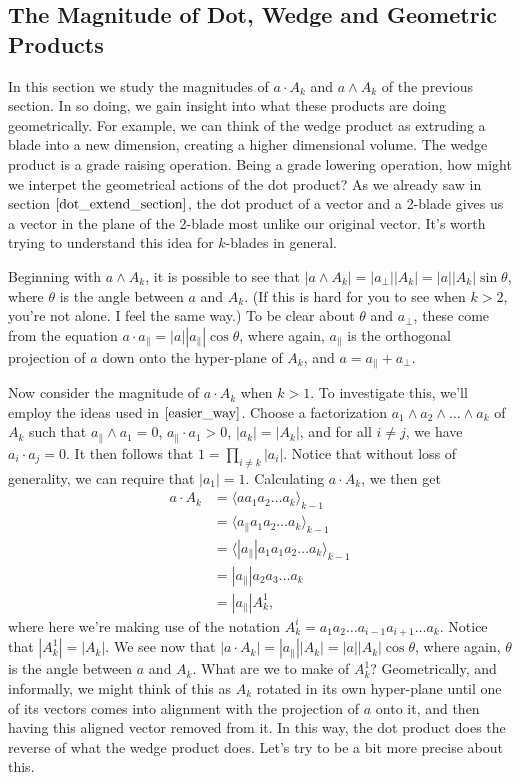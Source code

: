 \documentclass{article}
\newcommand{\prl}{\parallel}
\newcommand{\prp}{\perp}
\begin{document}
\subsection{The Magnitude of Dot, Wedge and Geometric Products}

In this section we study the magnitudes of $a\cdot A_k$
and $a\wedge A_k$ of the previous section.  In so doing,
we gain insight into what these products are doing geometrically.
For example, we can think of the wedge product as extruding
a blade into a new dimension, creating a higher dimensional
volume.  The wedge product is a grade raising operation.
Being a grade lowering operation, how might we interpet the
geometrical actions of the dot product?  As we already saw
in section $\eqref{dot_extend_section}$, the dot product of a vector and a 2-blade
gives us a vector in the plane of the 2-blade most unlike our original vector.
It's worth trying to understand this idea for $k$-blades in general.

Beginning with $a\wedge A_k$, it is possible to see that
$|a\wedge A_k|=|a_{\prp}||A_k|=|a||A_k|\sin\theta$,
where $\theta$ is the angle between $a$ and $A_k$.
(If this is hard for you to see when $k>2$, you're not alone.
I feel the same way.)  To be clear about $\theta$ and $a_{\prp}$,
these come from the equation $a\cdot a_{\prl}=|a||a_{\prl}|\cos\theta$,
where again, $a_{\prl}$ is the orthogonal projection of $a$
down onto the hyper-plane of $A_k$, and $a=a_{\prl}+a_{\prp}$.

Now consider the magnitude of $a\cdot A_k$ when $k>1$.  To investigate
this, we'll employ the ideas used in $\eqref{easier_way}$.
Choose a factorization $a_1\wedge a_2\wedge\dots\wedge a_k$ of $A_k$
such that $a_{\prl}\wedge a_1=0$, $a_{\prl}\cdot a_1>0$, $|a_k|=|A_k|$, and
for all $i\neq j$, we have $a_i\cdot a_j=0$.  It then follows that
$1=\prod_{i\neq k}|a_i|$.  Notice that without loss of generality, we can
require that $|a_1|=1$.  Calculating $a\cdot A_k$, we then get
\begin{align*}
a\cdot A_k &= \langle aa_1a_2\dots a_k\rangle_{k-1} \\
 &= \langle a_{\prl}a_1a_2\dots a_k\rangle_{k-1} \\
 &= \langle |a_{\prl}|a_1a_1a_2\dots a_k\rangle_{k-1} \\
 &= |a_{\prl}|a_2a_3\dots a_k \\
 &= |a_{\prl}|A_k^1,
\end{align*}
where here we're making use of the notation $A_k^i=a_1a_2\dots a_{i-1}a_{i+1}\dots a_k$.
Notice that $|A_k^1|=|A_k|$.  We see now that
$|a\cdot A_k|=|a_{\prl}||A_k|=|a||A_k|\cos\theta$,
where again, $\theta$ is the angle between $a$
and $A_k$.  What are we to make of $A_k^1$?
Geometrically, and informally, we might think of this as $A_k$
rotated in its own hyper-plane until one of its
vectors comes into alignment with the projection
of $a$ onto it, and then having this aligned
vector removed from it.  In this way, the dot product does the reverse
of what the wedge product does.  Let's try to be a bit more precise
about this.
\end{document}
